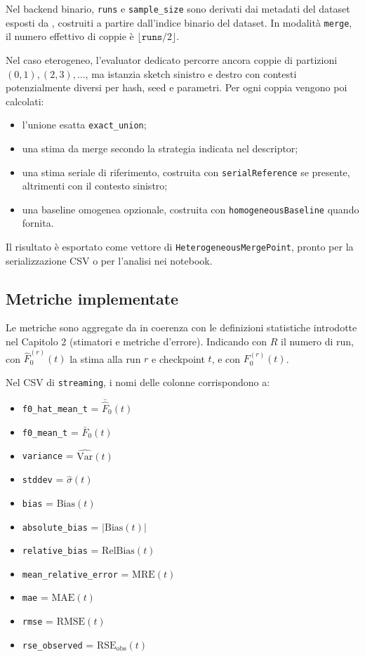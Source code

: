 Nel backend binario, \texttt{runs} e \texttt{sample\_size} sono derivati dai
metadati del dataset esposti da , costruiti a partire
dall'indice binario del dataset.
In modalità \texttt{merge}, il numero effettivo di coppie è
\(\lfloor \texttt{runs}/2 \rfloor\).

Nel caso eterogeneo, l'evaluator dedicato percorre ancora coppie di partizioni
\((0,1),(2,3),\dots\), ma istanzia sketch sinistro e destro con contesti
potenzialmente diversi per hash, seed e parametri. Per ogni coppia vengono poi
calcolati:
\begin{itemize}
    \item l'unione esatta \texttt{exact\_union};
    \item una stima da merge secondo la strategia indicata nel descriptor;
    \item una stima seriale di riferimento, costruita con \texttt{serialReference}
    se presente, altrimenti con il contesto sinistro;
    \item una baseline omogenea opzionale, costruita con
    \texttt{homogeneousBaseline} quando fornita.
\end{itemize}
Il risultato è esportato come vettore di \texttt{HeterogeneousMergePoint},
pronto per la serializzazione CSV o per l'analisi nei notebook.


\subsection{Metriche implementate}

Le metriche sono aggregate da  
in coerenza con le
definizioni statistiche introdotte nel Capitolo 2 (stimatori e metriche
d'errore).  
Indicando con \(R\) il numero di run, con \(\hat{F}_0^{(r)}(t)\) la stima alla
run \(r\) e checkpoint \(t\), e con \(F_0^{(r)}(t)\).

Nel CSV di \texttt{streaming}, i nomi delle colonne corrispondono a:

\begin{itemize}
    \item \texttt{f0\_hat\_mean\_t} = \(\bar{\hat{F}}_0(t)\)
    \item \texttt{f0\_mean\_t} = \(\bar{F}_0(t)\)
    \item \texttt{variance} = \(\widehat{\mathrm{Var}}(t)\)
    \item \texttt{stddev} = \(\widehat{\sigma}(t)\)
    \item \texttt{bias} = \(\mathrm{Bias}(t)\)
    \item \texttt{absolute\_bias} = \(\lvert \mathrm{Bias}(t) \rvert\)
    \item \texttt{relative\_bias} = \(\mathrm{RelBias}(t)\)
    \item \texttt{mean\_relative\_error} = \(\mathrm{MRE}(t)\)
    \item \texttt{mae} = \(\mathrm{MAE}(t)\)
    \item \texttt{rmse} = \(\mathrm{RMSE}(t)\)
    \item \texttt{rse\_observed} = \(\mathrm{RSE}_{\mathrm{obs}}(t)\)
\end{itemize}


